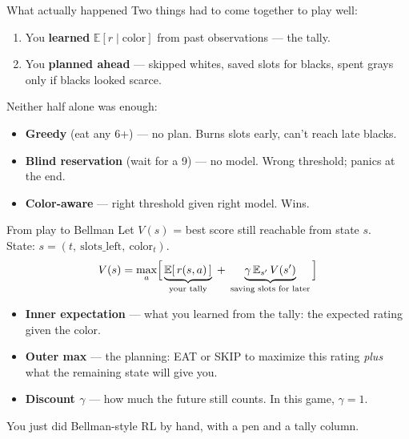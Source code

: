 \documentclass[aspectratio=169, 12pt, xcolor={dvipsnames,table}]{beamer}
\newcommand{\hintline}[1]{\vfill\begin{center}\small\textcolor{hint}{#1}\end{center}}
\begin{document}
\begin{frame}{What actually happened}
\large
Two things had to come together to play well:
\begin{enumerate}
  \item You \textbf{learned} $\mathbb{E}[r \mid \text{color}]$ from past observations --- the tally.
  \item You \textbf{planned ahead} --- skipped whites, saved slots for blacks, spent grays only if blacks looked scarce.
\end{enumerate}
\vfill
\begin{center}\large
Neither half alone was enough:
\end{center}
\begin{itemize}
  \item \textbf{Greedy} (eat any 6+) --- no plan. Burns slots early, can't reach late blacks.
  \item \textbf{Blind reservation} (wait for a 9) --- no model. Wrong threshold; panics at the end.
  \item \textbf{Color-aware} --- right threshold given right model. Wins.
\end{itemize}
\end{frame}

\begin{frame}{From play to Bellman}
\large
Let $V(s)$ = best score still reachable from state $s$.\\[0.5em]
State: $s = (t,\ \text{slots\_left},\ \text{color}_t)$.\\[0.8em]
\[
V(s) = \max_a \Bigl[\, \underbrace{\mathbb{E}[\,r(s,a)\,]}_{\text{\scriptsize your tally}} \; + \; \underbrace{\gamma\, \mathbb{E}_{s'}\,V(s')}_{\text{\scriptsize saving slots for later}} \,\Bigr]
\]
\vfill
\small
\begin{itemize}
  \item \textbf{Inner expectation} --- what you learned from the tally: the expected rating given the color.
  \item \textbf{Outer max} --- the planning: EAT or SKIP to maximize this rating \emph{plus} what the remaining state will give you.
  \item \textbf{Discount $\gamma$} --- how much the future still counts. In this game, $\gamma = 1$.
\end{itemize}
\hintline{You just did Bellman-style RL by hand, with a pen and a tally column.}
\end{frame}
\end{document}
